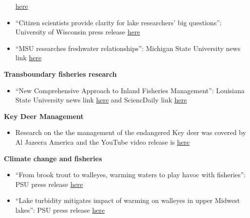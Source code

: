 \documentclass[10pt]{article}
\begin{document}
\begin{flushleft}
\begin{itemize}
\href{http://www.eurekalert.org/pub_releases/2014-04/p-o6y042814.php}{here} \\
\item ``Citizen scientists provide clarity for lake researchers’ big questions'': University of Wisconsin press release
\href{http://www.news.wisc.edu/22805}{here}  \\
\item ``MSU researches freshwater relationships'': Michigan State University news link \href{http://www.statenews.com/index.php/article/2010/06/msu_researches_freshwater_relationships}{here}\\
\vspace{5pt}
\end{itemize}
\textbf{Transboundary fisheries research}\\
\begin{itemize}
\item ``New Comprehensive Approach to Inland Fisheries Management'': Louisiana State University news link \href{http://www.lsu.edu/mediacenter/news/2016/09/13docs_midway_transfish.php}{here} and SciencDaily link \href{https://www.sciencedaily.com/releases/2016/09/160914130706.htm}{here}\\
\end{itemize}
\textbf{Key Deer Management}\\
\begin{itemize}
\vspace{5pt}
\item Research on the the management of the endangered Key deer was covered by Al Jazeera America and the YouTube video release is \href{http://www.youtube.com/watch?v=r6GX7tZiPFk}{here}\\
\vspace{5pt}
\end{itemize}
\textbf{Climate change and fisheries}\\
\begin{itemize}
\vspace{5pt}
\item ``From brook trout to walleyes, warming waters to play havoc with fisheries'': PSU press release \href{http://news.psu.edu/story/470451/2017/06/04/research/brook-trout-walleyes-warming-waters-play-havoc-fisheries}{here}\\
\vspace{5pt}

\item ``Lake turbidity mitigates impact of warming on walleyes in upper Midwest lakes'': PSU press release \href{https://news.psu.edu/story/649107/2021/02/26/research/lake-turbidity-mitigates-impact-warming-walleyes-upper-midwest}{here}\\
\end{itemize}


\end{flushleft}
\end{document}
